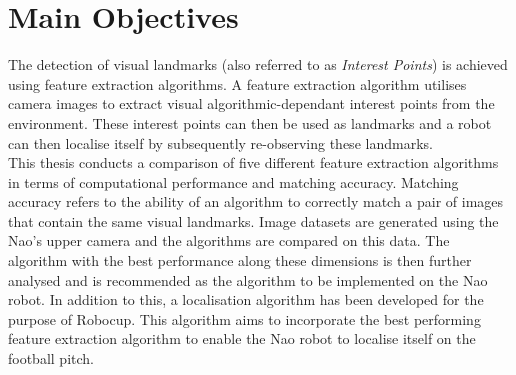 \documentclass[11pt]{report}
\begin{document}
\section{Main Objectives}
\label{sec:objectives}
The detection of visual landmarks (also referred to as \textit{Interest Points}) is achieved using feature extraction algorithms. A feature extraction algorithm utilises camera images to extract visual algorithmic-dependant interest points from the environment. These interest points can then be used as landmarks and a robot can then localise itself by subsequently re-observing these landmarks. \\

This thesis conducts a comparison of five different feature extraction algorithms in terms of computational performance and matching accuracy. Matching accuracy refers to the ability of an algorithm to correctly match a pair of images that contain the same visual landmarks. Image datasets are generated using the Nao's upper camera and the algorithms are compared on this data. The algorithm with the best performance along these dimensions is then further analysed and is recommended as the algorithm to be implemented on the Nao robot. In addition to this, a localisation algorithm has been developed for the purpose of Robocup. This algorithm aims to incorporate the best performing feature extraction algorithm to enable the Nao robot to localise itself on the football pitch.\\
\end{document}
